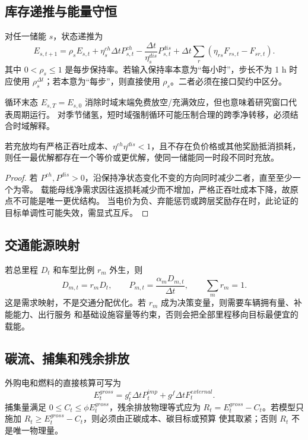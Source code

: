 \subsection{库存递推与能量守恒}

对任一储能 $s$，状态递推为
\begin{equation}
E_{s,t+1}=\rho_sE_{s,t}+\eta_s^{ch}\Delta t P_{s,t}^{ch}
-\frac{\Delta t}{\eta_s^{dis}}P_{s,t}^{dis}+\Delta t\sum_r
\left(\eta_{rs}F_{rs,t}-F_{sr,t}\right).
\label{eq:ies-storage}
\end{equation}
其中 $0<\rho_s\le1$ 是每步保持率。若输入保持率本意为“每小时”，步长不为 1 h 时应使用
$\rho_s^{\Delta t}$；若本意为“每步”，则直接使用 $\rho_s$。二者必须在接口契约中区分。

循环末态 $E_{s,T}=E_{s,0}$ 消除时域末端免费放空/充满效应，但也意味着研究窗口代表周期运行。
对季节储氢，短时域强制循环可能压制合理的跨季净转移，必须结合时域解释。

\begin{proposition}[无互斥变量时的同时充放]
若充放均有严格正吞吐成本、$\eta^{ch}\eta^{dis}<1$，且不存在负价格或其他奖励抵消损耗，
则任一最优解都存在一个等价或更优解，使同一储能同一时段不同时充放。
\end{proposition}
\begin{proof}
若 $P^{ch},P^{dis}>0$，沿保持净状态变化不变的方向同时减少二者，直至至少一个为零。
载能母线净需求因往返损耗减少而不增加，严格正吞吐成本下降，故原点不可能是唯一更优结构。
当电价为负、弃能惩罚或跨层奖励存在时，此论证的目标单调性可能失效，需显式互斥。
\end{proof}

\subsection{交通能源映射}

若总里程 $D_t$ 和车型比例 $r_m$ 外生，则
\begin{equation}
D_{m,t}=r_mD_t,\qquad
P_{m,t}=\frac{\alpha_mD_{m,t}}{\Delta t},\qquad \sum_mr_m=1.
\end{equation}
这是需求映射，不是交通分配优化。若 $r_m$ 成为决策变量，则需要车辆拥有量、补能能力、出行服务
和基础设施容量等约束，否则会把全部里程移向目标最便宜的载能。

\subsection{碳流、捕集和残余排放}

外购电和燃料的直接核算可写为
\begin{equation}
E_t^{gross}=g_t^e\Delta tP_t^{imp}+g^f\Delta tF_t^{external}.
\end{equation}
捕集量满足 $0\le C_t\le\phi E_t^{gross}$，残余排放物理等式应为
$R_t=E_t^{gross}-C_t$。若模型只施加 $R_t\ge E_t^{gross}-C_t$，则必须由正碳成本、碳目标或预算
使其取紧；否则 $R_t$ 不是唯一物理量。


